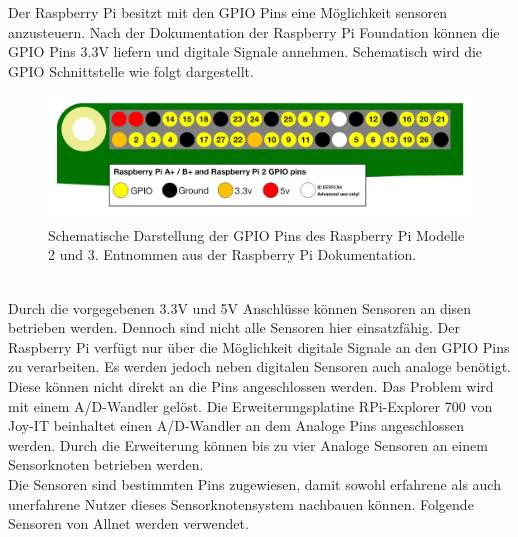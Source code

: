 Der Raspberry Pi besitzt mit den \ac{GPIO} Pins eine Möglichkeit sensoren anzusteuern. Nach der Dokumentation der Raspberry Pi Foundation\cite{GPIOMode77:online} können die \ac{GPIO} Pins 3.3V liefern und digitale Signale annehmen. Schematisch wird die \ac{GPIO} Schnittstelle wie folgt dargestellt.
\begin{figure}[h]
	\includegraphics[width=\textwidth]{Bilder/Kapitel2/gpio_pins_pi2.png}
	\caption[Schema GPIO Pins]{Schematische Darstellung der GPIO Pins des Raspberry Pi Modelle 2 und 3. Entnommen aus der Raspberry Pi Dokumentation\cite{GPIOMode77:online}.}
	\label{fig:Kapitel2/gpio_pins_pi2.png}
\end{figure}\\
Durch die vorgegebenen 3.3V und 5V Anschlüsse können Sensoren an disen betrieben werden. Dennoch sind nicht alle Sensoren hier einsatzfähig. Der Raspberry Pi verfügt nur über die Möglichkeit digitale Signale an den \ac{GPIO} Pins zu verarbeiten. Es werden jedoch neben digitalen Sensoren auch analoge benötigt. Diese können nicht direkt an die Pins angeschlossen werden. Das Problem wird mit einem \ac{A/D-Wandler} gelöst. Die Erweiterungsplatine RPi-Explorer 700 von Joy-IT \cite{joyitrpi87:online} beinhaltet einen \ac{A/D-Wandler} an dem Analoge Pins angeschlossen werden. Durch die Erweiterung können bis zu vier Analoge Sensoren an einem Sensorknoten betrieben werden.\\
Die Sensoren sind bestimmten Pins zugewiesen, damit sowohl erfahrene als auch unerfahrene Nutzer dieses Sensorknotensystem nachbauen können. Folgende Sensoren von Allnet\cite{111861pd90:online} werden verwendet.
